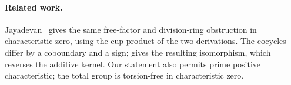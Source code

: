 
\paragraph{Related work.}
Jayadevan~\cite{jayadevan-18-76} gives the same free-factor and
division-ring obstruction in characteristic zero, using the cup product
of the two derivations. The cocycles differ by a coboundary and a sign;
\comparisonlocation{} gives the resulting isomorphism,
which reverses the additive kernel. Our statement also permits prime
positive characteristic; the total group is torsion-free in characteristic zero.
